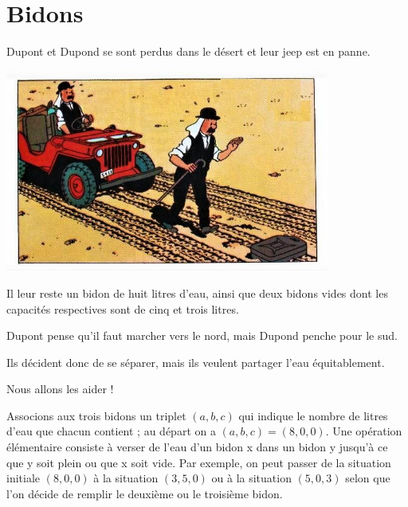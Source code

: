 \def\V{\text{\sc Vrai}\,}
\def\F{\text{\sc Faux}\,}
\def\ite{\text{\sc ite}\,}
\chapter{Bidons}
\thispagestyle{empty}
Dupont et Dupond se sont perdus dans le désert et leur jeep est en panne. 

\begin{center}
\includegraphics[width=0.8\textwidth]{dupond_t}
\end{center}


Il leur reste un bidon de huit litres d'eau, ainsi que deux bidons vides dont les capacités respectives sont de cinq et trois litres. 

Dupont pense qu'il faut marcher vers le nord, mais Dupond penche pour le sud. 

Ils décident donc de se séparer, mais ils veulent partager l'eau équitablement.

Nous allons les aider !

Associons aux trois bidons un triplet $(a, b, c)$ qui indique le nombre de litres d'eau que chacun contient ; au départ on a $(a, b, c) = (8, 0, 0)$. Une opération élémentaire consiste à verser de l'eau d'un bidon x dans un bidon y jusqu'à ce que y soit plein ou que x soit vide. 
Par exemple, on peut passer de la situation initiale $(8, 0, 0)$ à la situation $(3, 5, 0)$ ou à la situation $(5, 0, 3)$ selon que l'on décide de remplir le deuxième ou le troisième bidon.

